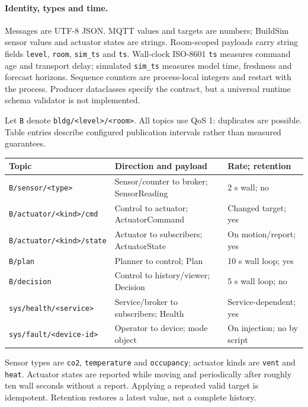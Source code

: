 \documentclass[11pt,a4paper]{article}
\begin{document}
\paragraph{Identity, types and time.}
Messages are UTF-8 JSON. MQTT values and targets are numbers; BuildSim sensor values and actuator states are strings. Room-scoped payloads carry string fields \texttt{level}, \texttt{room}, \texttt{sim\_ts} and \texttt{ts}. Wall-clock ISO-8601 \texttt{ts} measures command age and transport delay; simulated \texttt{sim\_ts} measures model time, freshness and forecast horizons. Sequence counters are process-local integers and restart with the process. Producer dataclasses specify the contract, but a universal runtime schema validator is not implemented.

Let \texttt{B} denote \texttt{bldg/<level>/<room>}. All topics use QoS 1: duplicates are possible. Table entries describe configured publication intervals rather than measured guarantees.
{\small
\begin{longtable}{p{57mm}p{53mm}p{34mm}}
\toprule Topic & Direction and payload & Rate; retention\\\midrule\endhead
\texttt{B/sensor/<type>} & Sensor/counter to broker; SensorReading & 2 s wall; no\\
\texttt{B/actuator/<kind>/cmd} & Control to actuator; ActuatorCommand & Changed target; yes\\
\texttt{B/actuator/<kind>/state} & Actuator to subscribers; ActuatorState & On motion/report; yes\\
\texttt{B/plan} & Planner to control; Plan & 10 s wall loop; yes\\
\texttt{B/decision} & Control to history/viewer; Decision & 5 s wall loop; no\\
\texttt{sys/health/<service>} & Service/broker to subscribers; Health & Service-dependent; yes\\
\texttt{sys/fault/<device-id>} & Operator to device; mode object & On injection; no by script\\\bottomrule
\end{longtable}}
Sensor types are \texttt{co2}, \texttt{temperature} and \texttt{occupancy}; actuator kinds are \texttt{vent} and \texttt{heat}. Actuator states are reported while moving and periodically after roughly ten wall seconds without a report. Applying a repeated valid target is idempotent. Retention restores a latest value, not a complete history.
\end{document}
